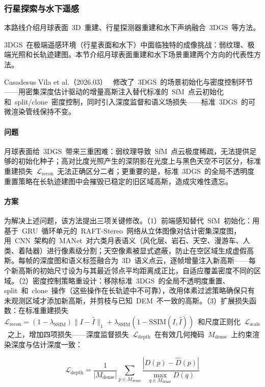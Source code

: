 \subsubsection{行星探索与水下遥感}

本路线介绍月球表面~3D~重建、行星探测器重建和水下声纳融合~3DGS~等方法。

3DGS~在极端遥感环境（行星表面和水下）中面临独特的成像挑战：弱纹理、极端光照和长轨迹建图。本节介绍月球表面重建和水下场景重建两个方向的代表性方法。

Casadesus Vila et al.（2026.03）~\cite{2603_18218} 修改了~3DGS~的场景初始化与密度控制环节——用密集深度估计驱动的增量高斯注入替代标准的~SfM~点云初始化和~split/clone~密度控制，同时引入深度监督和语义场损失——标准~3DGS~的可微渲染管线保持不变。

\paragraph{问题}月球表面给~3DGS~带来三重困难：弱纹理导致~SfM~点云极度稀疏，无法提供足够的初始化种子；高对比度光照产生的深阴影在光度上与黑色天空不可区分，标准重建损失~$\mathcal{L}_{\text{recon}}$~无法正确区分二者；更重要的是，标准~3DGS~的全局不透明度重置策略在长轨迹建图中会摧毁已稳定的旧区域高斯，造成灾难性遗忘。

\paragraph{方案}为解决上述问题，该方法提出三项关键修改。（1）前端感知替代~SfM~初始化：用基于~GRU~循环单元的~RAFT-Stereo~网络从立体图像对估计密集深度图，用~CNN~架构的~MANet~对六类月表语义（风化层、岩石、天空、漫游车、人类、着陆器）进行像素级分割；天空像素被显式遮蔽，防止在空区域生成虚假高斯。每帧的深度图和语义标签融合为~3D~语义点云，逐帧增量注入新高斯——每个新高斯的初始尺寸设为与其最近邻点平均距离成正比，自适应覆盖密度不同的区域。（2）密度控制策略重设计：移除标准~3DGS~的全局不透明度重置、split~和~clone~操作（这些操作在长轨迹中不可靠），改用体素过滤策略确保只有未观测区域才添加新高斯，并剪枝与已知~DEM~不一致的高斯。（3）扩展损失函数：在标准重建损失~$\mathcal{L}_{\text{recon}} = (1-\lambda_{\text{SSIM}})\|I-\hat{I}\|_1 + \lambda_{\text{SSIM}}(1-\text{SSIM}(I,\hat{I}))$~和尺度正则化~$\mathcal{L}_{\text{scale}}$~之上，增加四项损失——深度监督损失~$\mathcal{L}_{\text{depth}}$~在有效几何掩码~$M_{\text{dense}}$~上约束渲染深度与估计深度一致：

\begin{equation}
\mathcal{L}_{\text{depth}} = \frac{1}{|M_{\text{dense}}|}\sum_{p \in M_{\text{dense}}} \frac{|D(p)-\hat{D}(p)|}{\max_{q \in M_{\text{dense}}} D(q)}
\end{equation}

